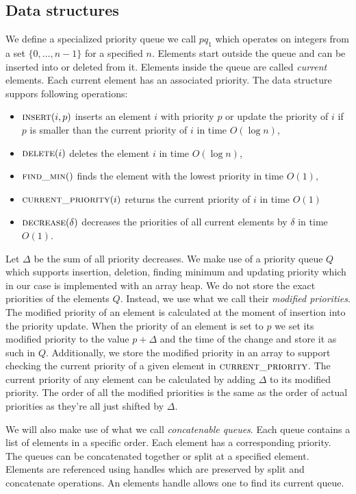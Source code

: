 \subsection{Data structures}

We define a specialized priority queue we call $pq_1$ which operates on integers from a set $\{0, \dots, n-1\}$ for a specified $n$. Elements start outside the queue and can be inserted into or deleted from it. Elements inside the queue are called \textit{current} elements. Each current element has an associated priority. The data structure suppors following operations:

\begin{itemize}
    \item $\textsc{insert}(i, p)$ inserts an element $i$ with priority $p$ or update the priority of $i$ if $p$ is smaller than the current priority of $i$ in time $O(\log n)$,
    \item $\textsc{delete}(i)$ deletes the element $i$ in time $O(\log n)$,
    \item $\textsc{find\_min}()$ finds the element with the lowest priority in time $O(1)$,
    \item $\textsc{current\_priority}(i)$ returns the current priority of $i$ in time $O(1)$
    \item $\textsc{decrease}(\delta)$ decreases the priorities of all current elements by $\delta$ in time $O(1)$.
\end{itemize}

Let $\Delta$ be the sum of all priority decreases. We make use of a priority queue $Q$ which supports insertion, deletion, finding minimum and updating priority which in our case is implemented with an array heap. We do not store the exact priorities of the elements  $Q$. Instead, we use what we call their \textit{modified priorities}. The modified priority of an element is calculated at the moment of insertion into the priority update. When the priority of an element is set to $p$ we set its modified priority to the value $p + \Delta$ and the time of the change and store it as such in $Q$. Additionally, we store the modified priority in an array to support checking the current priority of a given element in $\textsc{current\_priority}$. The current priority of any element can be calculated by adding $\Delta$ to its modified priority. The order of all the modified priorities is the same as the order of actual priorities as they're all just shifted by $\Delta$.

We will also make use of what we call \textit{concatenable queues}. Each queue contains a list of elements in a specific order. Each element has a corresponding priority. The queues can be concatenated together or split at a specified element. Elements are referenced using handles which are preserved by split and concatenate operations. An elements handle allows one to find its current queue.

